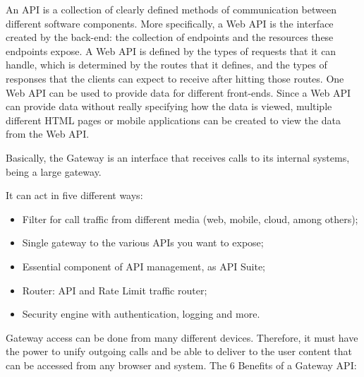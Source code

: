 An API is a collection of clearly defined methods of communication between different software components. More specifically, a Web API is the interface created by the back-end: the collection of endpoints and the resources these endpoints expose. A Web API is defined by the types of requests that it can handle, which is determined by the routes that it defines, and the types of responses that the clients can expect to receive after hitting those routes. One Web API can be used to provide data for different front-ends. Since a Web API can provide data without really specifying how the data is viewed, multiple different HTML pages or mobile applications can be created to view the data from the Web API.

Basically, the Gateway is an interface that receives calls to its internal systems, being a large gateway. 

It can act in five different ways:

\begin{itemize}
\item Filter for call traffic from different media (web, mobile, cloud, among others);
\item Single gateway to the various APIs you want to expose;
\item Essential component of API management, as API Suite;
\item Router: API and Rate Limit traffic router;
\item Security engine with authentication, logging and more.
\end{itemize}

Gateway access can be done from many different devices. Therefore, it must have the power to unify outgoing calls and be able to deliver to the user content that can be accessed from any browser and system. The 6 Benefits of a Gateway API:

